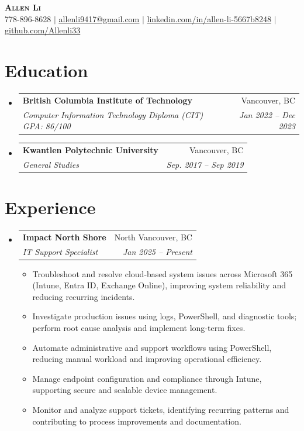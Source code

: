 \documentclass[letterpaper,11pt]{article}
\makeatletter
\newcommand{\resumeItem}[1]{
  \item\small{
    {#1 \vspace{-2pt}}
  }
}
\newcommand{\resumeSubheading}[4]{
  \vspace{-2pt}\item
    \begin{tabular*}{0.97\textwidth}[t]{l@{\extracolsep{\fill}}r}
      \textbf{#1} & #2 \\
      \textit{\small#3} & \textit{\small #4} \\
    \end{tabular*}\vspace{-7pt}
}
\newcommand{\resumeSubHeadingListStart}{\begin{itemize}[leftmargin=0.15in, label={}]}
\newcommand{\resumeSubHeadingListEnd}{\end{itemize}}
\newcommand{\resumeItemListStart}{\begin{itemize}}
\newcommand{\resumeItemListEnd}{\end{itemize}\vspace{-5pt}}
\makeatother
\begin{document}
\begin{center}
    \textbf{\Huge \scshape Allen Li} \\ \vspace{1pt}
    \small 778-896-8628 $|$ \href{mailto:allenli9417@gmail.com}{\underline{allenli9417@gmail.com}} $|$ 
    \href{https://linkedin.com/in/allen-li-5667b8248}{\underline{linkedin.com/in/allen-li-5667b8248}} $|$
    \href{https://github.com/Allenli33}{\underline{github.com/Allenli33}}
\end{center}

\section{Education}
  \resumeSubHeadingListStart
    \resumeSubheading
      {British Columbia Institute of Technology}{Vancouver, BC}
      {Computer Information Technology Diploma (CIT) GPA: 86/100}{Jan 2022 -- Dec 2023}
    \resumeSubheading
      {Kwantlen Polytechnic University}{Vancouver, BC}
      {General Studies}{Sep. 2017 -- Sep 2019}
  \resumeSubHeadingListEnd

\section{Experience}
  \resumeSubHeadingListStart

    \resumeSubheading
      {Impact North Shore}{North Vancouver, BC}
      {IT Support Specialist}{Jan 2025 – Present}
      \resumeItemListStart
      \resumeItem{Troubleshoot and resolve cloud-based system issues across Microsoft 365 (Intune, Entra ID, Exchange Online), improving system reliability and reducing recurring incidents.}
      \resumeItem{Investigate production issues using logs, PowerShell, and diagnostic tools; perform root cause analysis and implement long-term fixes.}
      \resumeItem{Automate administrative and support workflows using PowerShell, reducing manual workload and improving operational efficiency.}
      \resumeItem{Manage endpoint configuration and compliance through Intune, supporting secure and scalable device management.}
      \resumeItem{Monitor and analyze support tickets, identifying recurring patterns and contributing to process improvements and documentation.}
    \resumeItemListEnd
      

  \resumeSubHeadingListEnd    %

\end{document}
